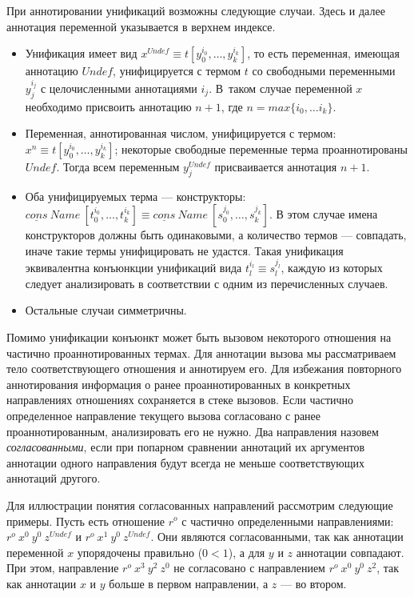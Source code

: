 \documentclass[conference,a4paper,american,russian]{IEEEtran}
\begin{document}
При аннотировании унификаций возможны следующие случаи.
Здесь и далее аннотация переменной указывается в верхнем индексе.
\begin{itemize}
    \item Унификация имеет вид $x^{Undef} \equiv t[y_0^{i_0}, \dots, y_k^{i_k}]$, то есть переменная, имеющая аннотацию $Undef$, унифицируется с термом $t$ со свободными переменными $y_j^{i_j}$ с целочисленными аннотациями $i_j$. В~таком случае переменной $x$ необходимо присвоить аннотацию $n + 1$, где $n = max \{ i_0, \dots i_k\}$.
    \item Переменная, аннотированная числом, унифицируется с термом: $x^{n} \equiv t[y_0^{i_0}, \dots, y_k^{i_k}]$; некоторые свободные переменные терма проаннотированы $Undef$.
    Тогда всем переменным $y_j^{Undef}$ присваивается аннотация $n+1$.
    \item Оба унифицируемых терма --- конструкторы: $\underline{cons} \ Name \ [t_0^{i_0}, \dots, t_k^{i_k}] \equiv \underline{cons} \ Name \ [s_0^{j_0}, \dots, s_k^{j_k}]$.
    В этом случае имена конструкторов должны быть одинаковыми, а количество термов --- совпадать, иначе такие термы унифицировать не удастся.
    Такая унификация эквивалентна конъюнкции унификаций вида $t_l^{i_l} \equiv s_l^{j_l}$, каждую из которых следует анализировать в соответствии с одним из перечисленных случаев.
    \item Остальные случаи симметричны.
\end{itemize}

Помимо унификации конъюнкт может быть вызовом некоторого отношения на частично проаннотированных термах.
Для аннотации вызова мы рассматриваем тело соответствующего отношения и аннотируем его.
Для избежания повторного аннотирования информация о ранее проаннотированных в конкретных направлениях отношениях сохраняется в стеке вызовов.
Если частично определенное направление текущего вызова согласовано с ранее проаннотированным, анализировать его не нужно.
Два направления назовем \emph{согласованными}, если при попарном сравнении аннотаций их аргументов аннотации одного направления будут всегда не меньше соответствующих аннотаций другого.

Для иллюстрации понятия согласованных направлений рассмотрим следующие примеры.
Пусть есть отношение $r^o$ с частично определенными направлениями: $r^o \ x^0 \ y^0 \ z^{Undef}$ и $r^o \ x^1 \ y^0 \ z^{Undef}$.
Они являются согласованными, так как аннотации переменной $x$ упорядочены правильно ($0 < 1$), а для $y$ и $z$ аннотации совпадают.
При этом, направление $r^o \ x^3 \ y^2 \ z^0$ не согласовано с направлением $r^o \ x^0 \ y^0 \ z^2$, так как аннотации $x$ и $y$ больше в первом направлении, а  $z$ --- во втором.
\end{document}
